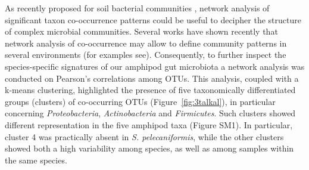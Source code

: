 As recently proposed for soil bacterial communities \cite{barberan2011using}, network analysis of significant taxon co-occurrence patterns could be useful to decipher the structure of complex microbial communities. Several works have shown recently that network analysis of co-occurrence may allow to define community patterns in several environments (for examples \cite{berry2014deciphering, boutin2014inter, williams2014demonstrating, geng2014co} see). Consequently, to further inspect the species-specific signatures of our amphipod gut microbiota a network analysis was conducted on Pearson's correlations among OTUs. This analysis, coupled with a k-means clustering, highlighted the presence of five taxonomically differentiated groups (clusters) of co-occurring OTUs (Figure~\ref{fig:3talkal}), in particular concerning \textit{Proteobacteria}, \textit{Actinobacteria} and \textit{Firmicutes}. Such clusters showed different representation in the five amphipod taxa (Figure SM1). In particular, cluster 4 was practically absent in \textit{S. pelecaniformis}, while the other clusters showed both a high variability among species, as well as among samples within the same species.\\%
